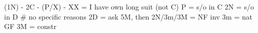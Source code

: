 (1N) - 2C - (P/X) -
    XX = I have own long suit (not C)
    P = s/o in C
    2N = s/o in D  # no specific reasons
    2D = ask 5M, then 2N/3m/3M = NF inv
    3m = nat GF
    3M = constr
